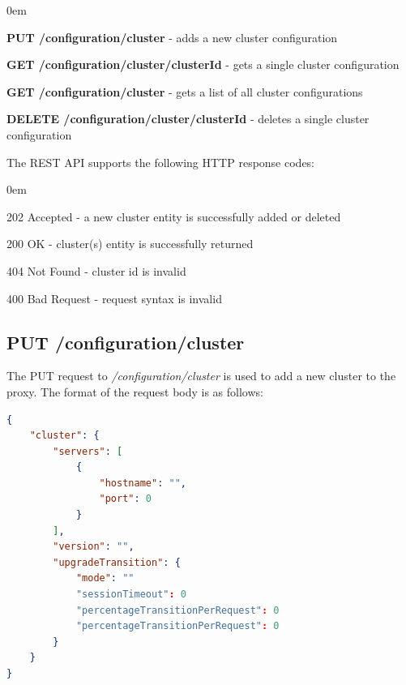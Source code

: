\documentclass[a4paper,11pt,twoside]{report}
\begin{document}
\begin{list}{-}{}
  \itemsep0em
  \item\textbf{{PUT /configuration/cluster}} - adds a new cluster configuration
  
  \item\textbf{{GET /configuration/cluster/{clusterId}}} -  gets a single cluster configuration
  
   \item\textbf{{GET /configuration/cluster}} - gets a list of all cluster configurations
   
   \item\textbf{{DELETE /configuration/cluster/{clusterId}}} -  deletes a single cluster configuration
  
\end{list}
\noindent
The REST API supports the following HTTP response codes:

\begin{list}{-}{}
  \itemsep0em
  \item{202 Accepted}  -  a new cluster entity is successfully added or deleted
  
  \item{200 OK} -  cluster(s) entity is successfully returned
  
   \item{404 Not Found} - cluster id is invalid
   
    \item{400 Bad Request } - request syntax is invalid
  
\end{list}

\subsection{PUT /configuration/cluster}\label{PUT}
The PUT request to \textit{/configuration/cluster}  is used to add a new cluster to the proxy. The format of the request body is as follows:\bigskip

\begin{lstlisting}[language=json]
{
    "cluster": {
        "servers": [
            {
                "hostname": "", 
                "port": 0
            }
        ], 
        "version": "", 
        "upgradeTransition": {
            "mode": ""
            "sessionTimeout": 0  
            "percentageTransitionPerRequest": 0
            "percentageTransitionPerRequest": 0  
        }
    }
}
\end{lstlisting}
\end{document}
